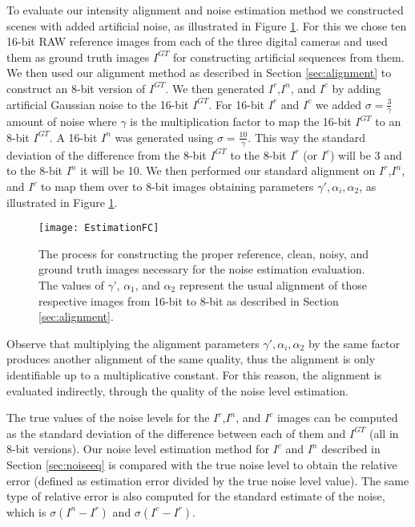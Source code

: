 \documentclass[review]{elsarticle}
\begin{document}
To evaluate our intensity alignment and noise estimation method we constructed scenes with added artificial noise, as illustrated in Figure \ref{fig:errorfc}. For this we chose ten 16-bit RAW reference images from each of the three digital cameras and used them as ground truth images $I^{GT}$ for constructing artificial sequences from them. We then used our alignment method as described in Section \ref{sec:alignment} to construct an 8-bit version of $I^{GT}$. We then generated $I^r$,$ I^n$, and $I^c$ by adding artificial Gaussian noise to the 16-bit $I^{GT}$. For 16-bit $I^r$ and $I^c$ we added $\sigma=\frac{3}{\gamma}$ amount of noise where $\gamma$ is the multiplication factor to map the 16-bit $I^{GT}$ to an 8-bit $I^{GT}$. A 16-bit $I^n$ was generated using $\sigma=\frac{10}{\gamma}$. This way the standard deviation of the difference from the 8-bit $I^{GT}$ to the 8-bit  $I^r$ (or  $I^c$) will be 3 and to the 8-bit  $I^n$ it will be 10.
 We then performed our standard alignment on $I^r$,$ I^n$, and $I^c$ to map them over to 8-bit images obtaining parameters $\gamma',\alpha_i,\alpha_2$, as illustrated in Figure \ref{fig:errorfc}. 
\begin{figure}[htb]
\centering
\vspace{-3mm}
\hspace{-1mm}\texttt{[image: EstimationFC]}
\vskip -4mm
\caption{The process for constructing the proper reference, clean, noisy, and ground truth images necessary for the noise estimation evaluation. The values of $\gamma$', $\alpha_{1}$, and $\alpha_{2}$ represent the usual alignment of those respective images from 16-bit to 8-bit as described in Section \ref{sec:alignment}.}
\vspace{-4mm}
\label{fig:errorfc}
\end{figure}






Observe that multiplying the alignment parameters $\gamma',\alpha_i,\alpha_2$ by the same factor produces another alignment of the same quality, thus the alignment is only identifiable up to a multiplicative constant. For this reason, the alignment is evaluated indirectly, through the quality of the noise level estimation. 

The true values of the noise levels for the $I^r$,$ I^n$, and $I^c$ images can be computed as the standard deviation of the difference between each of them and $I^{GT}$ (all in 8-bit versions). 
Our noise level estimation method for $I^c$ and $ I^n$ described in Section \ref{sec:noiseeq} is compared with the true noise level to obtain the relative error  (defined as estimation error divided by the true noise level value). The same type of relative error is also computed for the standard estimate of the noise, which is $\sigma(I^n-I^r)$ and $\sigma(I^c-I^r)$.
\end{document}
